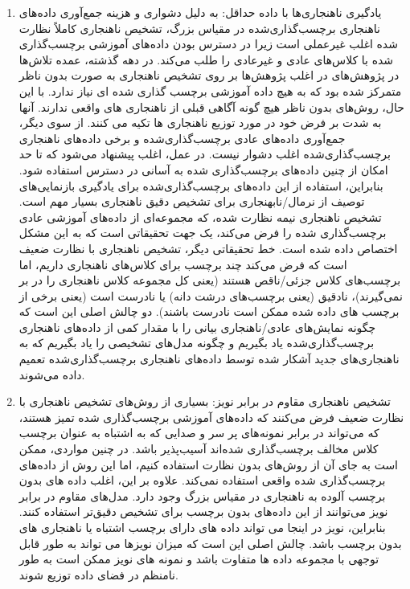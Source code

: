 \documentclass[12pt,a4paper]{report}
\theoremstyle{definition}
\theoremstyle{definition}
\begin{document}
\begin{enumerate}
\item {
	یادگیری ناهنجاری‌ها با داده حداقل:
به دلیل دشواری و هزینه جمع‌آوری داده‌های ناهنجاری برچسب‌گذاری‌شده در مقیاس بزرگ، تشخیص ناهنجاری کاملاً نظارت شده اغلب غیرعملی است زیرا در دسترس بودن داده‌های آموزشی برچسب‌گذاری شده با کلاس‌های عادی و غیرعادی را طلب می‌کند. در دهه گذشته، عمده تلاش‌ها در پژوهش‌های در اغلب پژوهش‌ها بر روی تشخیص ناهنجاری به صورت بدون ناظر متمرکز شده بود که به هیچ داده آموزشی برچسب گذاری شده ای نیاز ندارد. با این حال، روش‌های بدون ناظر هیچ گونه آگاهی قبلی از ناهنجاری های واقعی ندارند. آنها به شدت بر فرض خود در مورد توزیع ناهنجاری ها تکیه می کنند. از سوی دیگر، جمع‌آوری داده‌های عادی برچسب‌گذاری‌شده و برخی داده‌های ناهنجاری برچسب‌گذاری‌شده اغلب دشوار نیست. در عمل، اغلب پیشنهاد می‌شود که تا حد امکان از چنین داده‌های برچسب‌گذاری شده به آسانی در دسترس استفاده شود\cite{2}. بنابراین، استفاده از این داده‌های برچسب‌گذاری‌شده برای یادگیری بازنمایی‌های توصیف از نرمال/نابهنجاری برای تشخیص دقیق ناهنجاری بسیار مهم است. تشخیص ناهنجاری نیمه نظارت شده، که مجموعه‌ای از داده‌های آموزشی عادی برچسب‌گذاری شده را فرض می‌کند، یک جهت تحقیقاتی است که به این مشکل اختصاص داده شده است. خط تحقیقاتی دیگر، تشخیص ناهنجاری با نظارت ضعیف است که فرض می‌کند چند برچسب برای کلاس‌های ناهنجاری داریم، اما برچسب‌های کلاس جزئی/ناقص هستند (یعنی کل مجموعه کلاس ناهنجاری را در بر نمی‌گیرند)، نادقیق (یعنی برچسب‌های درشت دانه) یا نادرست است (یعنی برخی از برچسب های داده شده ممکن است نادرست باشند). دو چالش اصلی این است که چگونه نمایش‌های عادی/ناهنجاری بیانی را با مقدار کمی از داده‌های ناهنجاری برچسب‌گذاری‌شده یاد بگیریم و چگونه مدل‌های تشخیصی را یاد بگیریم که به ناهنجاری‌های جدید آشکار شده توسط داده‌های ناهنجاری برچسب‌گذاری‌شده تعمیم داده می‌شوند.

}

\item{
تشخیص ناهنجاری مقاوم در برابر نویز:
بسیاری از روش‌های تشخیص ناهنجاری با نظارت ضعیف فرض می‌کنند که داده‌های آموزشی برچسب‌گذاری شده تمیز هستند، که می‌تواند در برابر نمونه‌های پر سر و صدایی که به اشتباه به عنوان برچسب کلاس مخالف برچسب‌گذاری شده‌اند آسیب‌پذیر باشد. در چنین مواردی، ممکن است به جای آن از روش‌های بدون نظارت استفاده کنیم، اما این روش از داده‌های برچسب‌گذاری شده واقعی استفاده نمی‌کند. علاوه بر این، اغلب داده های بدون برچسب آلوده به ناهنجاری در مقیاس بزرگ وجود دارد. مدل‌های مقاوم در برابر نویز می‌توانند از این داده‌های بدون برچسب برای تشخیص دقیق‌تر استفاده کنند. بنابراین، نویز در اینجا می تواند داده های دارای برچسب اشتباه یا ناهنجاری های بدون برچسب باشد. چالش اصلی این است که میزان نویزها می تواند به طور قابل توجهی با مجموعه داده ها متفاوت باشد و نمونه های نویز ممکن است به طور نامنظم در فضای داده توزیع شوند.

}
\end{enumerate}
\end{document}
